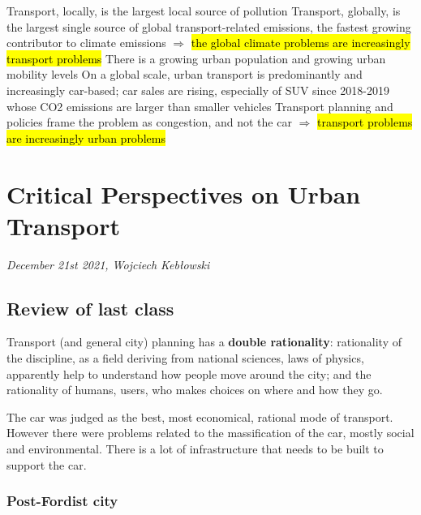 \documentclass{article}
\begin{document}
\begin{outline}
	\1 Transport, locally, is the largest local source of pollution
	\1 Transport, globally, is the largest single source of global transport-related emissions, the fastest growing contributor to climate emissions
		\2 $\Rightarrow$ \hl{the global climate problems are increasingly transport problems}
	\1 There is a growing urban population and growing urban mobility levels
	\1 On a global scale, urban transport is predominantly and increasingly car-based; car sales are rising, especially of SUV since 2018-2019 whose CO2 emissions are larger than smaller vehicles
	\1 Transport planning and policies frame the problem as congestion, and not the car
		\2 $\Rightarrow$ \hl{transport problems are increasingly urban problems}
\end{outline}
 

\section{Critical Perspectives on Urban Transport}
\textit{December 21st 2021, Wojciech Kebłowski}

\subsection{Review of last class}

Transport (and general city) planning has a \textbf{double rationality}: rationality of the discipline, as a field deriving from national sciences, laws of physics, apparently help to understand how people move around the city; and the rationality of humans, users, who makes choices on where and how they go.

The car was judged as the best, most economical, rational mode of transport. However there were problems related to the massification of the car, mostly social and environmental. There is a lot of infrastructure that needs to be built to support the car.

\subsubsection{Post-Fordist city}
\end{document}
